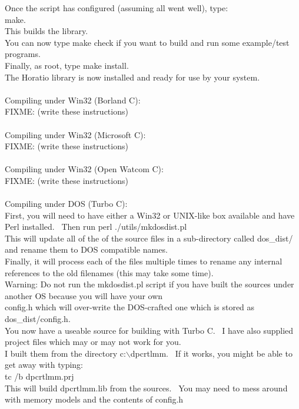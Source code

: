 \documentclass{article}
\begin{document}
Once the script has configured
(assuming all went well), type:\\
make.\\
This builds the library.\\
You can now type make check if you
want to build and run some
example/test programs.\\
Finally, as root, type make
install.\\
The Horatio library is now
installed and ready for use by your system.\\
\\
Compiling under Win32 (Borland C):\\
FIXME: (write these instructions)\\
\\
Compiling under Win32 (Microsoft C):\\
FIXME: (write these instructions)\\
\\
Compiling under Win32 (Open Watcom C):\\
FIXME: (write these instructions)\\
\\
Compiling under DOS (Turbo C):\\
First, you will need to have
either a Win32 or UNIX-like box available and have Perl
installed.~ Then run perl ./utils/mkdosdist.pl\\
This will update all of the of the source files in a sub-directory
called dos\_dist/ and rename them to DOS compatible names.\\
Finally, it will process each of the files multiple times to rename any
internal references to the old filenames (this may take some time).\\
Warning: Do not run the mkdosdist.pl script if you have built the
sources under another OS because you will have your own\\
config.h which will over-write the DOS-crafted one which is stored as
dos\_dist/config.h.\\
You now have a useable source for building with Turbo C.~ I have
also supplied project files which may or may not work for you.\\
I built them from the directory c:$\backslash$dpcrtlmm.~ If it works, you
might be able to get away with typing:\\
tc /b dpcrtlmm.prj\\
This will build dpcrtlmm.lib from the sources.~ You may need to
mess around with memory models and the contents of config.h\\
\end{document}
